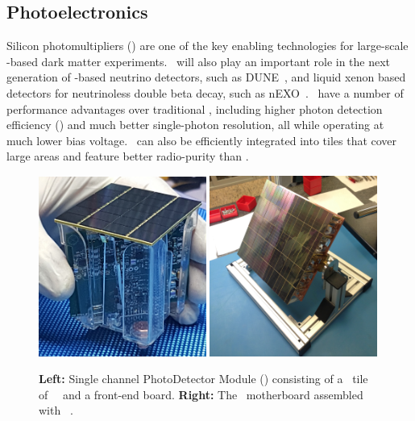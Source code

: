 \subsection{Photoelectronics}
\label{sec:PE}

Silicon photomultipliers (\SiPMs) are one of the key enabling technologies for large-scale \LAr-based dark matter experiments.  \SiPMs\ will also play an important role in the next generation of \LAr-based neutrino detectors, such as DUNE~\cite{Acciarri:2016wz}, and liquid xenon based detectors for neutrinoless double beta decay, such as nEXO~\cite{Ostrovskiy:2015jl}.  \SiPMs\ have a number of performance advantages over traditional \PMTs, including higher photon detection efficiency (\PDE) and much better single-photon resolution, all while operating at much lower bias voltage. \SiPMs\ can also be efficiently integrated into tiles that cover large areas and feature better radio-purity than \PMTs.

\begin{figure}[!thbp]
\includegraphics[width=0.49\textwidth]{./Figures/PDM-photo.jpg}
\includegraphics[width=0.49\textwidth]{./Figures/MB-photo_cut.jpg}
\caption[The first \DSkPdm\ and first motherboard resulting from the assembly of \DSkPdms]{{\bf Left:} Single channel PhotoDetector Module (\DSkPdm) consisting of   a \DSkTileAreaStd\ tile of  \DSkTileSiPMsCustomNumber\ \SiPMs\ and a front-end board.  {\bf Right:}  The \DSks\ motherboard assembled with \DSkSQBPdmsNumber\ \DSkPdms.}
\label{fig:PDM+MB}
\end{figure}



